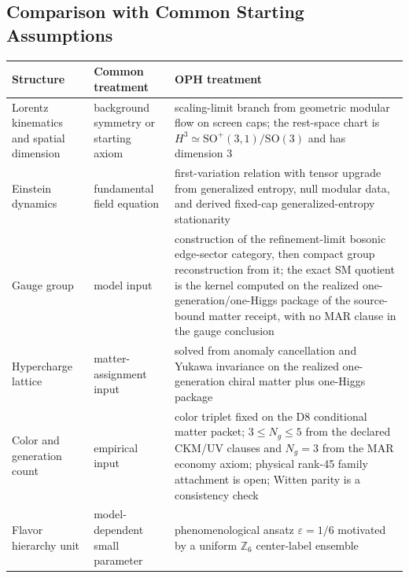 \documentclass[11pt]{article}
\begin{document}
\subsection*{Comparison with Common Starting Assumptions}

\begingroup
\footnotesize
\begin{longtable}{@{}>{\raggedright\arraybackslash}p{}>{\raggedright\arraybackslash}p{}>{\raggedright\arraybackslash}p{}@{}}
\toprule
Structure & Common treatment & OPH treatment \\
\midrule
\endhead
Lorentz kinematics and spatial dimension & background symmetry or starting axiom & scaling-limit branch from geometric modular flow on screen caps; the rest-space chart is \(H^3\simeq\mathrm{SO}^+(3,1)/\mathrm{SO}(3)\) and has dimension \(3\) \\
Einstein dynamics & fundamental field equation & first-variation relation with tensor upgrade from generalized entropy, null modular data, and derived fixed-cap generalized-entropy stationarity \\
Gauge group & model input & construction of the refinement-limit bosonic edge-sector category, then compact group reconstruction from it; the exact SM quotient is the kernel computed on the realized one-generation/one-Higgs package of the source-bound matter receipt, with no MAR clause in the gauge conclusion \\
Hypercharge lattice & matter-assignment input & solved from anomaly cancellation and Yukawa invariance on the realized one-generation chiral matter plus one-Higgs package \\
Color and generation count & empirical input & color triplet fixed on the D8 conditional matter packet; \(3\le N_g\le5\) from the declared CKM/UV clauses and \(N_g=3\) from the MAR economy axiom; physical rank-45 family attachment is open; Witten parity is a consistency check \\
Flavor hierarchy unit & model-dependent small parameter & phenomenological ansatz \(\varepsilon=1/6\) motivated by a uniform \(\mathbb Z_6\) center-label ensemble \\

\end{longtable}
\end{document}
